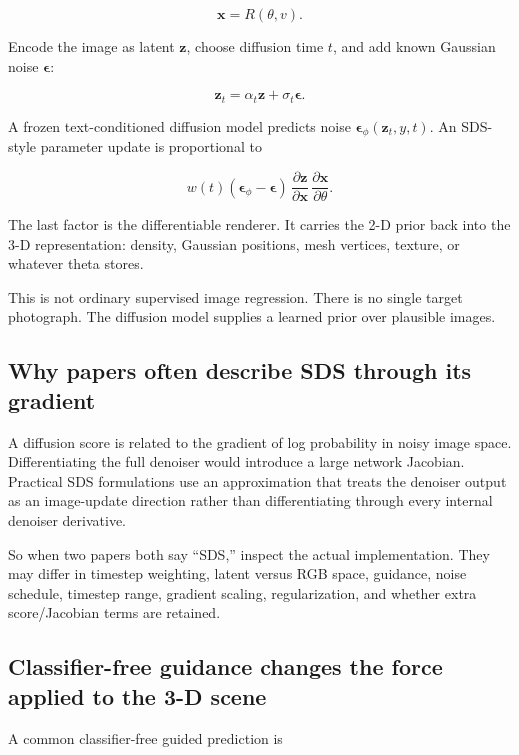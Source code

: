 \[\mathbf x=R(\theta,v).\]

Encode the image as latent \(\mathbf z\), choose diffusion time \(t\), and add known Gaussian noise \(\boldsymbol\epsilon\):

\[\mathbf z_t=\alpha_t\mathbf z+\sigma_t\boldsymbol\epsilon.\]

A frozen text-conditioned diffusion model predicts noise \(\boldsymbol\epsilon_\phi(\mathbf z_t,y,t)\). An SDS-style parameter update is proportional to

\[w(t)(\boldsymbol\epsilon_\phi-\boldsymbol\epsilon)\,\frac{\partial\mathbf z}{\partial\mathbf x}\,\frac{\partial\mathbf x}{\partial\theta}.\]

The last factor is the differentiable renderer. It carries the 2-D prior back into the 3-D representation: density, Gaussian positions, mesh vertices, texture, or whatever theta stores.

This is not ordinary supervised image regression. There is no single target photograph. The diffusion model supplies a learned prior over plausible images.

\subsection{Why papers often describe SDS through its gradient}\label{04-visual-computing-ii-ch035-why-papers-often-describe-sds-through-its-gradient}

A diffusion score is related to the gradient of log probability in noisy image space. Differentiating the full denoiser would introduce a large network Jacobian. Practical SDS formulations use an approximation that treats the denoiser output as an image-update direction rather than differentiating through every internal denoiser derivative.

So when two papers both say ``SDS,'' inspect the actual implementation. They may differ in timestep weighting, latent versus RGB space, guidance, noise schedule, timestep range, gradient scaling, regularization, and whether extra score/Jacobian terms are retained.

\subsection{Classifier-free guidance changes the force applied to the 3-D scene}\label{04-visual-computing-ii-ch035-classifier-free-guidance-changes-the-force-applied-to-the-3-d-scene}

A common classifier-free guided prediction is

